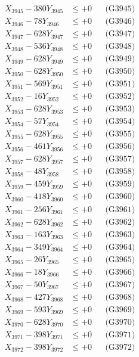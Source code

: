 \documentclass[a4paper,10pt]{article}
\begin{document}
{\begin{align}
X_{3945} - 380Y_{3945} &\leq +0 && \text{(G3945)} \\
X_{3946} - 78Y_{3946} &\leq +0 && \text{(G3946)} \\
X_{3947} - 628Y_{3947} &\leq +0 && \text{(G3947)} \\
X_{3948} - 536Y_{3948} &\leq +0 && \text{(G3948)} \\
X_{3949} - 628Y_{3949} &\leq +0 && \text{(G3949)} \\
X_{3950} - 628Y_{3950} &\leq +0 && \text{(G3950)} \\
\allowbreak
X_{3951} - 569Y_{3951} &\leq +0 && \text{(G3951)} \\
X_{3952} - 16Y_{3952} &\leq +0 && \text{(G3952)} \\
X_{3953} - 628Y_{3953} &\leq +0 && \text{(G3953)} \\
X_{3954} - 57Y_{3954} &\leq +0 && \text{(G3954)} \\
X_{3955} - 628Y_{3955} &\leq +0 && \text{(G3955)} \\
X_{3956} - 461Y_{3956} &\leq +0 && \text{(G3956)} \\
X_{3957} - 628Y_{3957} &\leq +0 && \text{(G3957)} \\
X_{3958} - 48Y_{3958} &\leq +0 && \text{(G3958)} \\
X_{3959} - 459Y_{3959} &\leq +0 && \text{(G3959)} \\
X_{3960} - 418Y_{3960} &\leq +0 && \text{(G3960)} \\
\allowbreak
X_{3961} - 256Y_{3961} &\leq +0 && \text{(G3961)} \\
X_{3962} - 628Y_{3962} &\leq +0 && \text{(G3962)} \\
X_{3963} - 163Y_{3963} &\leq +0 && \text{(G3963)} \\
X_{3964} - 349Y_{3964} &\leq +0 && \text{(G3964)} \\
X_{3965} - 26Y_{3965} &\leq +0 && \text{(G3965)} \\
X_{3966} - 18Y_{3966} &\leq +0 && \text{(G3966)} \\
X_{3967} - 50Y_{3967} &\leq +0 && \text{(G3967)} \\
X_{3968} - 427Y_{3968} &\leq +0 && \text{(G3968)} \\
X_{3969} - 593Y_{3969} &\leq +0 && \text{(G3969)} \\
X_{3970} - 628Y_{3970} &\leq +0 && \text{(G3970)} \\
\allowbreak
X_{3971} - 398Y_{3971} &\leq +0 && \text{(G3971)} \\
X_{3972} - 398Y_{3972} &\leq +0 && \text{(G3972)} \\

\end{align}}
\end{document}
